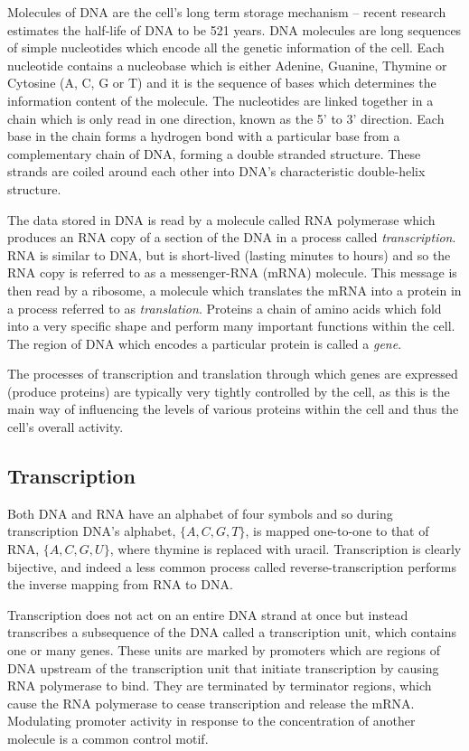 Molecules of DNA are the cell's long term storage mechanism -- recent research
estimates the half-life of DNA to be 521 years\cite{DNAhalflife}.
DNA molecules are long sequences of simple nucleotides which encode all the
genetic information of the cell.
Each nucleotide contains a nucleobase which is either Adenine, Guanine,
Thymine or Cytosine (A, C, G or T) and it is the sequence of bases 
which determines the information content of the molecule.
The nucleotides are linked together in a chain which is only read in one 
direction, known as the 5' to 3' direction.
Each base in the chain forms a hydrogen bond with a particular base from a 
complementary chain of DNA, forming a double stranded structure.
These strands are coiled around each other into DNA's characteristic 
double-helix structure.

The data stored in DNA is read by a molecule called RNA polymerase which 
produces an RNA copy of a section of the DNA in a process called
\textit{transcription}.
RNA is similar to DNA, but is short-lived (lasting minutes to hours) and so the
RNA copy is referred to as a messenger-RNA (mRNA) molecule.
This message is then read by a ribosome, a molecule which translates the mRNA 
into a protein in a process referred to as \textit{translation}.
Proteins a chain of amino acids which fold into a very specific shape and 
perform many important functions within the cell.
The region of DNA which encodes a particular protein is called a \textit{gene}.

The processes of transcription and translation through which genes are 
expressed (produce proteins) are typically very tightly
controlled by the cell, as this is the main way of influencing the levels of
various proteins within the cell and thus the cell's overall activity.

\subsection{Transcription}
\label{sec:transcription}

Both DNA and RNA have an alphabet of four symbols and so during transcription
DNA's alphabet, $\{A,C,G,T\}$, is mapped one-to-one to that
of RNA, $\{A,C,G,U\}$, where thymine is replaced with uracil.
Transcription is clearly bijective, and indeed a less common process called
reverse-transcription performs the inverse mapping from RNA to DNA.

Transcription does not act on an entire DNA strand at once but instead
transcribes a subsequence of the DNA called a transcription unit, which
contains one or many genes.
These units are marked by promoters which are regions of DNA upstream
of the transcription unit that initiate transcription by causing RNA polymerase
to bind.
They are terminated by terminator regions, which cause the RNA polymerase to
cease transcription and release the mRNA.
Modulating promoter activity in response to the concentration of another 
molecule is a common control motif.

